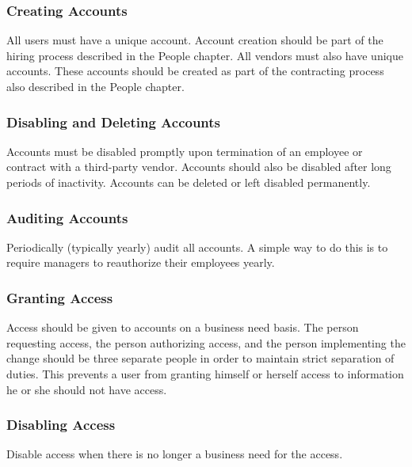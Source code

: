 \subsubsection{Creating Accounts}All users must have a unique account. Account creation should be part of the hiring process described in the People chapter. All vendors must also have unique accounts. These accounts should be created as part of the contracting process also described in the People chapter.
\subsubsection{Disabling and Deleting Accounts}Accounts must be disabled promptly upon termination of an employee or contract with a third-party vendor. Accounts should also be disabled after long periods of inactivity. Accounts can be deleted or left disabled permanently.
\subsubsection{Auditing Accounts}Periodically (typically yearly) audit all accounts. A simple way to do this is to require managers to reauthorize their employees yearly. 
\subsubsection{Granting Access}Access should be given to accounts on a business need basis. The person requesting access, the person authorizing access, and the person implementing the change should be three separate people in order to maintain strict separation of duties. This prevents a user from granting himself or herself access to information he or she should not have access.
\subsubsection{Disabling Access}Disable access when there is no longer a business need for the access.
